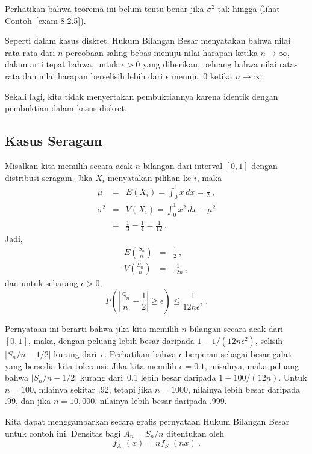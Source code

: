 {Perhatikan bahwa teorema ini belum tentu benar jika $\sigma^2$ tak hingga
(lihat Contoh~\ref{exam 8.2.5}).

Seperti dalam kasus diskret, Hukum Bilangan Besar menyatakan bahwa nilai rata-rata
dari $n$ percobaan saling bebas menuju nilai harapan ketika $n \to \infty$, dalam
arti tepat bahwa, untuk $\epsilon > 0$ yang diberikan, peluang bahwa nilai rata-rata
dan nilai harapan berselisih lebih dari $\epsilon$ menuju~0 ketika $n
\to \infty$.

Sekali lagi, kita tidak menyertakan pembuktiannya karena identik dengan pembuktian dalam kasus diskret.
\subsection*{Kasus Seragam}
\begin{example}
Misalkan kita memilih secara acak $n$ bilangan dari interval $[0,1]$ dengan
distribusi seragam.  Jika $X_i$ menyatakan pilihan ke-$i$, maka
\begin{eqnarray*}
          \mu & = & E(X_i) = \int_0^1 x\, dx = \frac 12\ , \\
     \sigma^2 & = & V(X_i) = \int_0^1 x^2\, dx - \mu^2 \\
              & = & \frac 13 - \frac 14 = \frac 1{12}\ .
\end{eqnarray*}
Jadi,
\begin{eqnarray*}
E \left( \frac {S_n}n \right)  & = & \frac 12\ , \\
V \left( \frac {S_n}n \right)  & = & \frac 1{12n}\ ,
\end{eqnarray*}
dan untuk sebarang $\epsilon > 0$,
$$
P \left( \left| \frac {S_n}n - \frac 12 \right| \geq \epsilon \right) \leq \frac
1{12n \epsilon^2}\ .
$$

Pernyataan ini berarti bahwa jika kita memilih $n$ bilangan secara acak dari $[0,1]$, maka,
dengan peluang lebih besar daripada $1 - 1/(12n\epsilon^2)$, selisih $|S_n/n -
1/2|$ kurang dari~$\epsilon$.  Perhatikan bahwa $\epsilon$ berperan sebagai
besar galat yang bersedia kita toleransi: Jika kita memilih $\epsilon = 0.1$, misalnya,
maka peluang bahwa $|S_n/n - 1/2|$ kurang dari~0.1 lebih besar daripada $1 -
100/(12n)$.  Untuk $n = 100$, nilainya sekitar .92, tetapi jika $n = 1000$, nilainya lebih besar
daripada .99, dan jika $n = 10{,}000$, nilainya lebih besar daripada .999.

Kita dapat menggambarkan secara grafis pernyataan Hukum Bilangan Besar untuk contoh ini.
Densitas bagi $A_n = S_n/n$ ditentukan oleh
$$
f_{A_n}(x) = nf_{S_n}(nx)\ .
$$


\end{example}}
